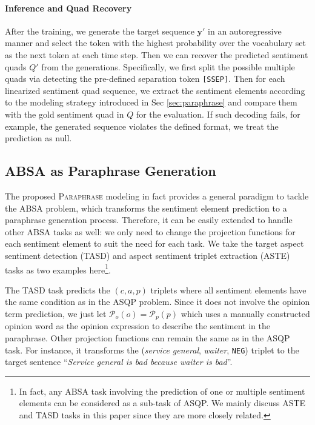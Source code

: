 \documentclass[11pt]{article}
\begin{document}
\paragraph{Inference and Quad Recovery}
After the training, we generate the target sequence $\boldsymbol{y'}$ in an autoregressive manner and select the token with the highest probability over the vocabulary set as the next token at each time step.
Then we can recover the predicted sentiment quads $Q'$ from the generations. Specifically, we first split the possible multiple quads via detecting the pre-defined separation token \texttt{[SSEP]}. Then for each linearized sentiment quad sequence, we extract the sentiment elements according to the modeling strategy introduced in Sec \ref{sec:paraphrase} and compare them with the gold sentiment quad in $Q$ for the evaluation.
If such decoding fails, for example, the generated sequence violates the defined format, we treat the prediction as null.


\subsection{ABSA as Paraphrase Generation} \label{sec:absa-para}

The proposed \textsc{Paraphrase} modeling in fact provides a general paradigm to tackle the ABSA problem, which transforms the sentiment element prediction to a paraphrase generation process. Therefore, it can be easily extended to handle other ABSA tasks as well: we only need to change the projection functions for each sentiment element to suit the need for each task. We take the target aspect sentiment detection (TASD) \cite{aaai20-tasd} and aspect sentiment triplet extraction (ASTE) \cite{aaai20-robin} tasks as two examples here\footnote{In fact, any ABSA task involving the prediction of one or multiple sentiment elements can be considered as a sub-task of ASQP. We mainly discuss ASTE and TASD tasks in this paper since they are more closely related.}.

The TASD task predicts the $(c, a, p)$ triplets where all sentiment elements have the same condition as in the ASQP problem. Since it does not involve the opinion term prediction, we just let $\mathcal{P}_o(o) = \mathcal{P}_p(p)$ which uses a manually constructed opinion word as the opinion expression to describe the sentiment in the paraphrase. Other projection functions can remain the same as in the ASQP task. For instance, it transforms the (\textit{service general}, \textit{waiter}, \texttt{NEG}) triplet to the target sentence ``\textit{Service general is bad because waiter is bad}''.
\end{document}
